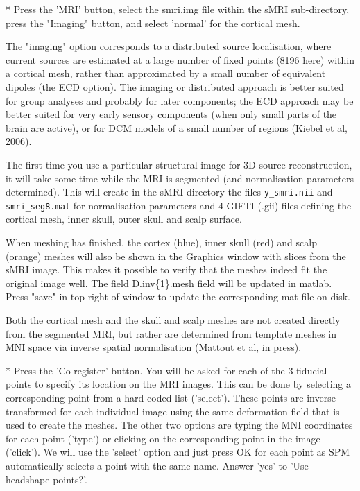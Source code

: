 * Press the 'MRI' button, select the smri.img file within the sMRI sub-directory, press the "Imaging" button, and select 'normal' for the cortical mesh.

The "imaging" option corresponds to a distributed source localisation, where current sources are estimated at a large number of fixed points (8196 here) within a cortical mesh, rather than approximated by a small number of equivalent dipoles (the ECD option). The imaging or distributed approach is better suited for group analyses and probably for later components; the ECD approach may be better suited for very early sensory components (when only small parts of the brain are active), or for DCM models of a small number of regions (Kiebel et al, 2006).

The first time you use a particular structural image for 3D source reconstruction, it will take some time while the MRI is segmented (and normalisation parameters determined). This will create in the sMRI directory the files \verb!y_smri.nii! and \verb!smri_seg8.mat! for normalisation parameters and 4 GIFTI (.gii) files defining the cortical mesh, inner skull, outer skull and scalp surface. 

When meshing has finished, the cortex (blue), inner skull (red) and scalp (orange) meshes will also be shown in the Graphics window with slices from the sMRI image. This makes it possible to verify that the meshes indeed fit the original image well. The field D.inv\{1\}.mesh field will be updated in matlab. Press "save" in top right of window to update the corresponding mat file on disk.

Both the cortical mesh and the skull and scalp meshes are not created directly from the segmented MRI, but rather are determined from template meshes in MNI space via inverse spatial normalisation (Mattout et al, in press).

* Press the 'Co-register' button. You will be asked for each of the 3 fiducial points to specify its location on the MRI images. This can be done by  selecting a corresponding point from a hard-coded list ('select'). These points are inverse transformed for each individual image using the same deformation field that is used to create the meshes. The other two options are typing the MNI coordinates for each point ('type') or clicking on the corresponding point in the image ('click'). We will use the 'select' option and just press OK for each point as SPM automatically selects a point with the same name. Answer 'yes' to 'Use headshape points?'.

